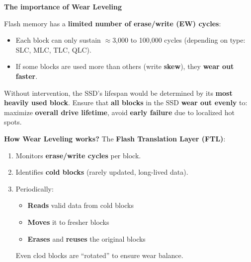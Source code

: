 \begin{flushleft}
    \textcolor{Green3}{ \textbf{The importance of Wear Leveling}}
\end{flushleft}
Flash memory has a \textbf{limited number of erase/write (EW) cycles}:
\begin{itemize}
    \item Each block can only sustain $\approx$3,000 to 100,000 cycles (depending on type: SLC, MLC, TLC, QLC).
    \item If some blocks are used more than others (write \textbf{skew}), they \textbf{wear out faster}.
\end{itemize}
Without intervention, the SSD's lifespan would be determined by its \textbf{most heavily used block}. Ensure that \textbf{all blocks} in the SSD \textbf{wear out evenly} to: maximize \textbf{overall drive lifetime}, avoid \textbf{early failure} due to localized hot spots.

\highspace
\textcolor{Green3}{ \textbf{How Wear Leveling works?}} The \textbf{Flash Translation Layer (FTL)}:
\begin{enumerate}
    \item Monitors \textbf{erase/write cycles} per block.
    \item Identifies \textbf{cold blocks} (rarely updated, long-lived data).
    \item Periodically:
    \begin{itemize}
        \item \textbf{Reads} valid data from cold blocks
        \item \textbf{Moves} it to fresher blocks
        \item \textbf{Erases} and \textbf{reuses} the original blocks
    \end{itemize}
    Even clod blocks are ``rotated'' to ensure wear balance.
\end{enumerate}

\newpage

